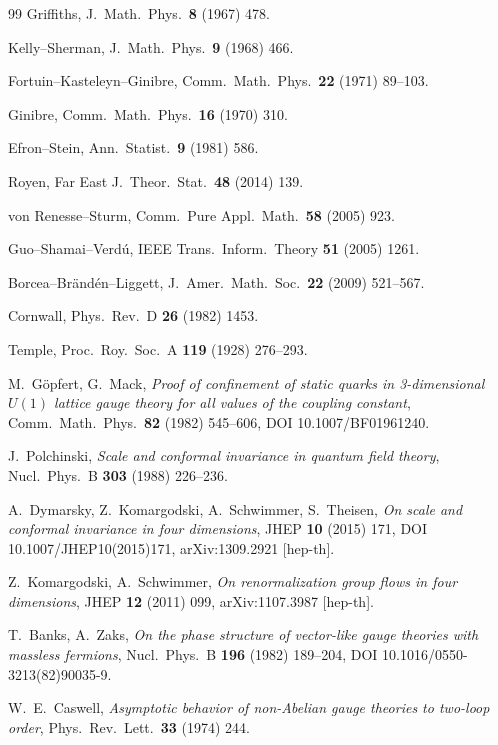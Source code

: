 {\begin{thebibliography}{99}
 Griffiths, J.\ Math.\ Phys.\ \textbf{8} (1967) 478.

 Kelly--Sherman, J.\ Math.\ Phys.\ \textbf{9} (1968) 466.

 Fortuin--Kasteleyn--Ginibre, Comm.\ Math.\ Phys.\ \textbf{22} (1971) 89--103.

 Ginibre, Comm.\ Math.\ Phys.\ \textbf{16} (1970) 310.

 Efron--Stein, Ann.\ Statist.\ \textbf{9} (1981) 586.

 Royen, Far East J.\ Theor.\ Stat.\ \textbf{48} (2014) 139.

 von Renesse--Sturm, Comm.\ Pure Appl.\ Math.\ \textbf{58} (2005) 923.

 Guo--Shamai--Verd\'u, IEEE Trans.\ Inform.\ Theory \textbf{51} (2005) 1261.

 Borcea--Br\"and\'en--Liggett, J.\ Amer.\ Math.\ Soc.\ \textbf{22} (2009)
  521--567.

 Cornwall, Phys.\ Rev.\ D \textbf{26} (1982) 1453.

 Temple, Proc.\ Roy.\ Soc.\ A \textbf{119} (1928) 276--293.

 M.~G\"opfert, G.~Mack, \emph{Proof of confinement of static quarks in
  3-dimensional $U(1)$ lattice gauge theory for all values of the coupling constant},
  Comm.\ Math.\ Phys.\ \textbf{82} (1982) 545--606, DOI 10.1007/BF01961240.

 J.~Polchinski, \emph{Scale and conformal invariance in quantum field
  theory}, Nucl.\ Phys.\ B \textbf{303} (1988) 226--236.

 A.~Dymarsky, Z.~Komargodski, A.~Schwimmer, S.~Theisen, \emph{On scale and
  conformal invariance in four dimensions}, JHEP \textbf{10} (2015) 171,
  DOI 10.1007/JHEP10(2015)171, arXiv:1309.2921 [hep-th].

 Z.~Komargodski, A.~Schwimmer, \emph{On renormalization group
  flows in four dimensions}, JHEP \textbf{12} (2011) 099, arXiv:1107.3987 [hep-th].

 T.~Banks, A.~Zaks, \emph{On the phase structure of vector-like gauge
  theories with massless fermions}, Nucl.\ Phys.\ B \textbf{196} (1982) 189--204,
  DOI 10.1016/0550-3213(82)90035-9.

 W.~E.~Caswell, \emph{Asymptotic behavior of non-Abelian gauge theories to
  two-loop order}, Phys.\ Rev.\ Lett.\ \textbf{33} (1974) 244.


\end{thebibliography}}
